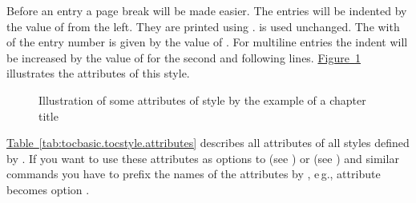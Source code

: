 \begin{description}
  Before an entry a page break will be made easier. The entries will be
  indented by the value of  from the left. They are printed
  using .  is used unchanged. The with of
  the entry number is given by the value of . For multiline
  entries the indent will be increased by the value of  for
  the second and following lines. \hyperref[fig:tocbasic.undottedtocline]%
  {Figure~\ref*{fig:tocbasic.undottedtocline}} illustrates the attributes of
  this style.
  \begin{figure}
    \centering
    \caption{Illustration of some attributes of style 
      by the example of a chapter title}%
    \label{fig:tocbasic.undottedtocline}
  \end{figure}
\end{description}
\hyperref[tab:tocbasic.tocstyle.attributes]%
{Table~\ref*{tab:tocbasic.tocstyle.attributes}} describes all attributes of
all styles defined by . If you want to use these attributes
as options to  (see
) or
 (see
) and similar
commands you have to prefix the names of the attributes by , e\,g.,
attribute  becomes option .

